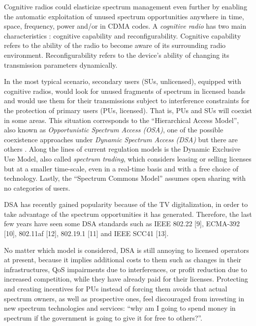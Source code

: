 Cognitive radios \cite{ref:Mitola1999} could elasticize spectrum management even further by enabling the automatic exploitation of unused spectrum opportunities anywhere in time, space, frequency, power and/or in CDMA codes.
A \emph{cognitive radio} has two main characteristics \cite{ref:Akyildiz2006}: cognitive capability and reconfigurability. 
Cognitive capability refers to the ability of the radio to become aware of its surrounding radio environment. Reconfigurability refers to the device's ability of changing its transmission parameters dynamically.

In the most typical scenario, secondary users (SUs, unlicensed), equipped with cognitive radios, would look for unused fragments of spectrum in licensed bands and would use them for their transmissions subject to interference constraints for the protection of primary users (PUs, licensed). That is, PUs and SUs will coexist in some areas.
This situation corresponds to the “Hierarchical Access Model”, also known as \emph{Opportunistic Spectrum Access (OSA)}, one of the possible coexistence approaches under \emph{Dynamic Spectrum Access (DSA)} but there are others \cite{ref:Zhao2007_sur}. 
Along the lines of current regulation models is the Dynamic Exclusive Use Model, also called \emph{spectrum trading}, which considers leasing or selling licenses but at a smaller time-scale, even in a real-time basis and with a free choice of technology.
Lastly, the “Spectrum Commons Model”  assumes open sharing with no categories of users.

DSA has recently gained popularity because of the TV digitalization, in order to take advantage of the spectrum opportunities it has generated. %
Therefore, the last few years have seen some DSA standards such as IEEE 802.22 [9], ECMA-392 [10], 802.11af [12], 802.19.1 [11] and IEEE SCC41 [13].

No matter which model is considered, DSA is still annoying to licensed operators at present, because it implies additional costs to them such as changes in their infrastructures, QoS impairments due to interferences, or profit reduction due to increased competition, while they have already paid for their licenses. %
Protecting and creating incentives for PUs instead of forcing them avoids that actual spectrum owners, as well as prospective ones, feel discouraged from investing in new spectrum technologies and services: \enquote{why am I going to spend money in spectrum if the government is going to give it for free to others?}.

